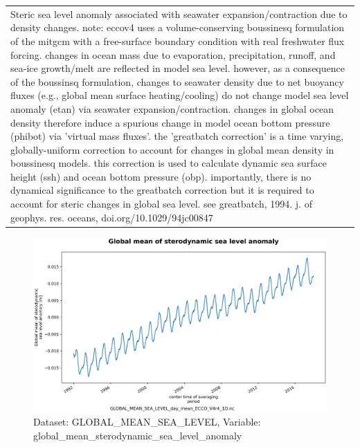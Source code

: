 \begin{longtable}{|m{}|m{}|m{}|m{}|}
\rowcolor{lightgray} \multicolumn{4}{|c|}{\textbf{Comments}} \\ \hline
\multicolumn{4}{|p{1\textwidth}|}{Steric sea level anomaly associated with seawater expansion/contraction due to density changes. note: eccov4 uses a volume-conserving boussinesq formulation of the mitgcm with a free-surface boundary condition with real freshwater flux forcing. changes in ocean mass due to evaporation, precipitation, runoff, and sea-ice growth/melt are reflected in model sea level. however, as a consequence of the boussinsq formulation, changes to seawater density due to net buoyancy fluxes (e.g., global mean surface heating/cooling) do not change model sea level anomaly (etan) via seawater expansion/contraction. changes in global ocean density therefore induce a spurious change in model ocean bottom pressure (phibot) via 'virtual mass fluxes'. the 'greatbatch correction' is a time varying, globally-uniform correction to account for changes in global mean density in boussinesq models. this correction is used to calculate dynamic sea surface height (ssh) and ocean bottom pressure (obp). importantly, there is no dynamical significance to the greatbatch correction but it is required to account for steric changes in global sea level. see greatbatch, 1994. j. of geophys. res. oceans, doi.org/10.1029/94jc00847} \\ \hline
\end{longtable}

\begin{figure}[H]
\centering
\includegraphics[scale=0.55]{../images/plots/oneD_plots/Global_Mean_Sea_Level/global_mean_sterodynamic_sea_level_anomaly.png}
\caption{Dataset: GLOBAL\_MEAN\_SEA\_LEVEL, Variable: global\_mean\_sterodynamic\_sea\_level\_anomaly}
\label{tab:table-GLOBAL_MEAN_SEA_LEVEL_global_mean_sterodynamic_sea_level_anomaly-Plot}
\end{figure}
